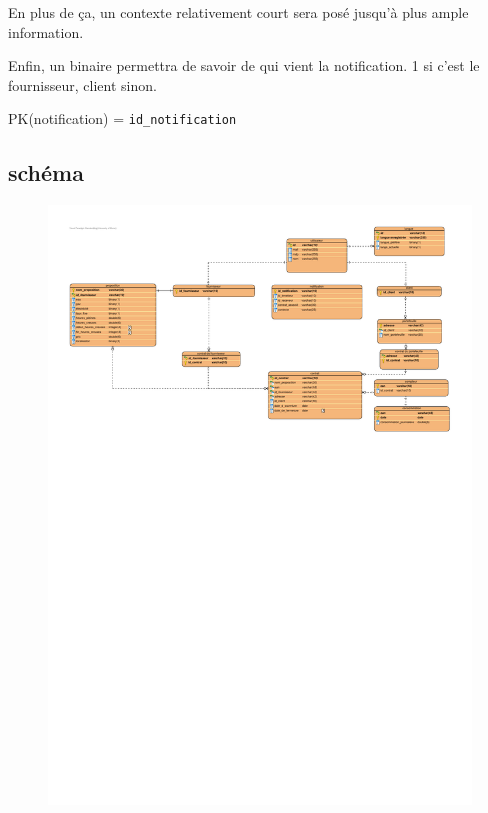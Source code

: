 \begin{flushleft}
En plus de ça, un contexte relativement court sera posé jusqu'à plus ample information.
\end{flushleft}

\begin{flushleft}
Enfin, un binaire permettra de savoir de qui vient la notification. 1 si c'est le fournisseur, client sinon.
\end{flushleft}

\begin{flushleft}
PK(notification) = \texttt{id\_notification}
\end{flushleft}

\newpage

\subsection{schéma}
\begin{figure}[h]
\includegraphics[scale=0.5]{Base/bdd/img/bdd.pdf}
\end{figure}
